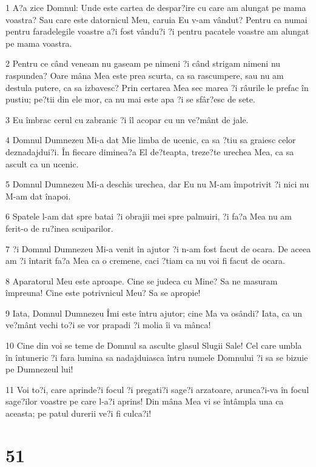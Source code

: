 \par 1 A?a zice Domnul: Unde este cartea de despar?ire cu care am alungat pe mama voastra? Sau care este datornicul Meu, caruia Eu v-am vândut? Pentru ca numai pentru faradelegile voastre a?i fost vându?i ?i pentru pacatele voastre am alungat pe mama voastra.
\par 2 Pentru ce când veneam nu gaseam pe nimeni ?i când strigam nimeni nu raspundea? Oare mâna Mea este prea scurta, ca sa rascumpere, sau nu am destula putere, ca sa izbavesc? Prin certarea Mea sec marea ?i râurile le prefac în pustiu; pe?tii din ele mor, ca nu mai este apa ?i se sfâr?esc de sete.
\par 3 Eu îmbrac cerul cu zabranic ?i îl acopar cu un ve?mânt de jale.
\par 4 Domnul Dumnezeu Mi-a dat Mie limba de ucenic, ca sa ?tiu sa graiesc celor deznadajdui?i. În fiecare diminea?a El de?teapta, treze?te urechea Mea, ca sa ascult ca un ucenic.
\par 5 Domnul Dumnezeu Mi-a deschis urechea, dar Eu nu M-am împotrivit ?i nici nu M-am dat înapoi.
\par 6 Spatele l-am dat spre batai ?i obrajii mei spre palmuiri, ?i fa?a Mea nu am ferit-o de ru?inea scuiparilor.
\par 7 ?i Domnul Dumnezeu Mi-a venit în ajutor ?i n-am fost facut de ocara. De aceea am ?i întarit fa?a Mea ca o cremene, caci ?tiam ca nu voi fi facut de ocara.
\par 8 Aparatorul Meu este aproape. Cine se judeca cu Mine? Sa ne masuram împreuna! Cine este potrivnicul Meu? Sa se apropie!
\par 9 Iata, Domnul Dumnezeu Îmi este întru ajutor; cine Ma va osândi? Iata, ca un ve?mânt vechi to?i se vor prapadi ?i molia îi va mânca!
\par 10 Cine din voi se teme de Domnul sa asculte glasul Slugii Sale! Cel care umbla în întuneric ?i fara lumina sa nadajduiasca întru numele Domnului ?i sa se bizuie pe Dumnezeul lui!
\par 11 Voi to?i, care aprinde?i focul ?i pregati?i sage?i arzatoare, arunca?i-va în focul sage?ilor voastre pe care l-a?i aprins! Din mâna Mea vi se întâmpla una ca aceasta; pe patul durerii ve?i fi culca?i!

\chapter{51}


